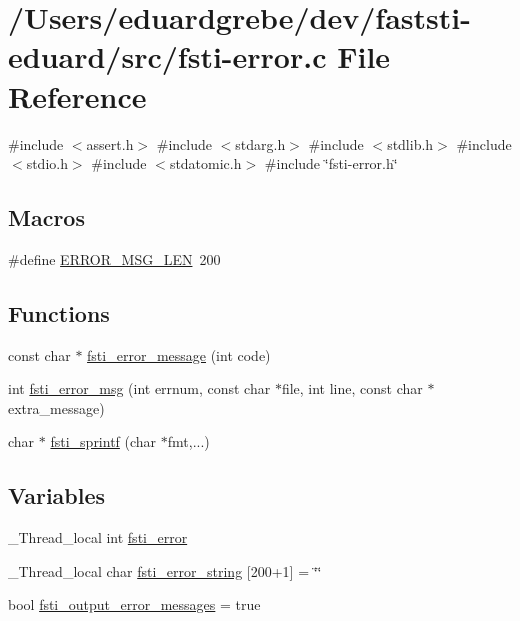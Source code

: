 \hypertarget{fsti-error_8c}{}\section{/\+Users/eduardgrebe/dev/faststi-\/eduard/src/fsti-\/error.c File Reference}
\label{fsti-error_8c}
{\ttfamily \#include $<$assert.\+h$>$}\newline
{\ttfamily \#include $<$stdarg.\+h$>$}\newline
{\ttfamily \#include $<$stdlib.\+h$>$}\newline
{\ttfamily \#include $<$stdio.\+h$>$}\newline
{\ttfamily \#include $<$stdatomic.\+h$>$}\newline
{\ttfamily \#include \char`\"{}fsti-\/error.\+h\char`\"{}}\newline
\subsection*{Macros}
\begin{DoxyCompactItemize}
\item 
\#define \mbox{\hyperlink{fsti-error_8c_a73e3216fb5d7453e74727559c51b2582}{E\+R\+R\+O\+R\+\_\+\+M\+S\+G\+\_\+\+L\+EN}}~200
\end{DoxyCompactItemize}
\subsection*{Functions}
\begin{DoxyCompactItemize}
\item 
const char $\ast$ \mbox{\hyperlink{fsti-error_8c_af06abad6908dc30d87bb7602f867afb5}{fsti\+\_\+error\+\_\+message}} (int code)
\item 
int \mbox{\hyperlink{fsti-error_8c_a07bba2015aafadb550151f076c6b7843}{fsti\+\_\+error\+\_\+msg}} (int errnum, const char $\ast$file, int line, const char $\ast$extra\+\_\+message)
\item 
char $\ast$ \mbox{\hyperlink{fsti-error_8c_a43bc036e5103ed01c68a28a583ce7e3b}{fsti\+\_\+sprintf}} (char $\ast$fmt,...)
\end{DoxyCompactItemize}
\subsection*{Variables}
\begin{DoxyCompactItemize}
\item 
\+\_\+\+Thread\+\_\+local int \mbox{\hyperlink{fsti-error_8c_a2fa89546149e592da51f9cd5324ddb1a}{fsti\+\_\+error}}
\item 
\+\_\+\+Thread\+\_\+local char \mbox{\hyperlink{fsti-error_8c_a99f70ec33b72be8e72a89fc904bcdb36}{fsti\+\_\+error\+\_\+string}} \mbox{[}200+1\mbox{]} = \char`\"{}\char`\"{}
\item 
bool \mbox{\hyperlink{fsti-error_8c_aa816d4518d32fccf93d6989309eefa04}{fsti\+\_\+output\+\_\+error\+\_\+messages}} = true
\end{DoxyCompactItemize}


